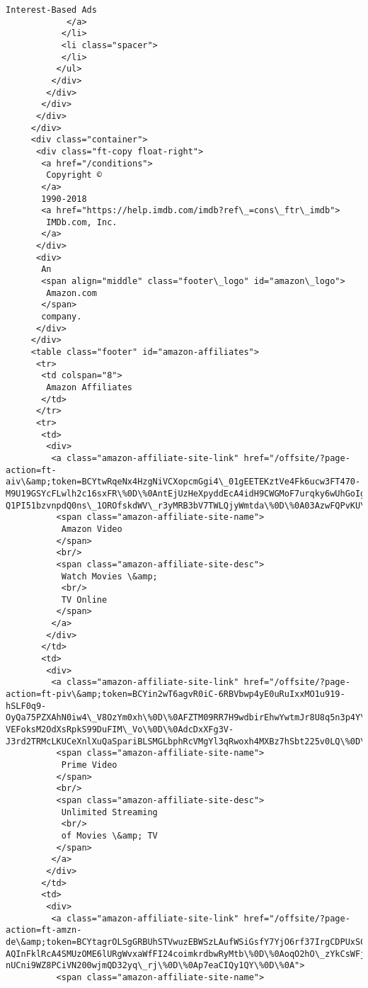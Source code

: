 \documentclass[11pt]{article}
\begin{document}
\begin{Verbatim}[commandchars=\\\{\}]
             Interest-Based Ads
            </a>
           </li>
           <li class="spacer">
           </li>
          </ul>
         </div>
        </div>
       </div>
      </div>
     </div>
     <div class="container">
      <div class="ft-copy float-right">
       <a href="/conditions">
        Copyright ©
       </a>
       1990-2018
       <a href="https://help.imdb.com/imdb?ref\_=cons\_ftr\_imdb">
        IMDb.com, Inc.
       </a>
      </div>
      <div>
       An
       <span align="middle" class="footer\_logo" id="amazon\_logo">
        Amazon.com
       </span>
       company.
      </div>
     </div>
     <table class="footer" id="amazon-affiliates">
      <tr>
       <td colspan="8">
        Amazon Affiliates
       </td>
      </tr>
      <tr>
       <td>
        <div>
         <a class="amazon-affiliate-site-link" href="/offsite/?page-action=ft-aiv\&amp;token=BCYtwRqeNx4HzgNiVCXopcmGgi4\_01gEETEKztVe4Fk6ucw3FT470-M9U19GSYcFLwlh2c16sxFR\%0D\%0AntEjUzHeXpyddEcA4idH9CWGMoF7urqky6wUhGoIgnhMAWiszRve50o\_WE5PaEe\_lLJQjXzJmH3V\%0D\%0AIwIBGXweYesPhChM5ht91lKA4o-Q1PI51bzvnpdQ0ns\_1OROfskdWV\_r3yMRB3bV7TWLQjyWmtda\%0D\%0A03AzwFQPvKU\%0D\%0A">
          <span class="amazon-affiliate-site-name">
           Amazon Video
          </span>
          <br/>
          <span class="amazon-affiliate-site-desc">
           Watch Movies \&amp;
           <br/>
           TV Online
          </span>
         </a>
        </div>
       </td>
       <td>
        <div>
         <a class="amazon-affiliate-site-link" href="/offsite/?page-action=ft-piv\&amp;token=BCYin2wT6agvR0iC-6RBVbwp4yE0uRuIxxMO1u919-hSLF0q9-OyQa75PZXAhN0iw4\_V8OzYm0xh\%0D\%0AFZTM09RR7H9wdbirEhwYwtmJr8U8q5n3p4Y\_awuw244ur5Fw9-VEFoksM2OdXsRpkS99DuFIM\_Vo\%0D\%0AdcDxXFg3V-J3rd2TRMcLKUCeXnlXuQaSpariBLSMGLbphRcVMgYl3qRwoxh4MXBz7hSbt225v0LQ\%0D\%0AAC\_cN3UHxqg\%0D\%0A">
          <span class="amazon-affiliate-site-name">
           Prime Video
          </span>
          <br/>
          <span class="amazon-affiliate-site-desc">
           Unlimited Streaming
           <br/>
           of Movies \&amp; TV
          </span>
         </a>
        </div>
       </td>
       <td>
        <div>
         <a class="amazon-affiliate-site-link" href="/offsite/?page-action=ft-amzn-de\&amp;token=BCYtagrOLSgGRBUhSTVwuzEBWSzLAufWSiGsfY7YjO6rf37IrgCDPUxSCqxymvN0sZH2dxKSsDdH\%0D\%0Axn8m5oMfW1qeIeMpWCZ\_Q50liHzx-AQInFklRcA4SMUzOME6lURgWvxaWfFI24coimkrdbwRyMtb\%0D\%0AoqO2hO\_zYkCsWFjZnxrWYMKsQ5ErijWQYDQ3Fhmgy3B6uP-nUCni9WZ8PCiVN200wjmQD32yq\_rj\%0D\%0Ap7eaCIQy1QY\%0D\%0A">
          <span class="amazon-affiliate-site-name">

\end{Verbatim}
\end{document}
